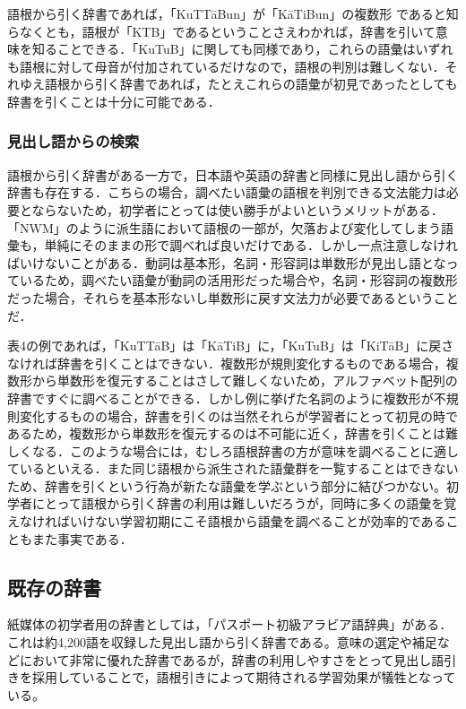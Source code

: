 \documentclass[technicalreport]{ieicej}
\begin{document}
語根から引く辞書であれば，「KuTTāBun」が「KāTiBun」の複数形 であると知らなくとも，語根が「KTB」であるということさえわかれば，辞書を引いて意味を知ることできる．「KuTuB」に関しても同様であり，これらの語彙はいずれも語根に対して母音が付加されているだけなので，語根の判別は難しくない．それゆえ語根から引く辞書であれば，たとえこれらの語彙が初見であったとしても辞書を引くことは十分に可能である．

\subsubsection{見出し語からの検索}
語根から引く辞書がある一方で，日本語や英語の辞書と同様に見出し語から引く辞書も存在する．こちらの場合，調べたい語彙の語根を判別できる文法能力は必要とならないため，初学者にとっては使い勝手がよいというメリットがある．「NWM」のように派生語において語根の一部が，欠落および変化してしまう語彙も，単純にそのままの形で調べれば良いだけである．しかし一点注意しなければいけないことがある．動詞は基本形，名詞・形容詞は単数形が見出し語となっているため，調べたい語彙が動詞の活用形だった場合や，名詞・形容詞の複数形だった場合，それらを基本形ないし単数形に戻す文法力が必要であるということだ．

表4の例であれば，「KuTTāB」は「KāTiB」に，「KuTuB」は「KiTāB」に戻さなければ辞書を引くことはできない．複数形が規則変化するものである場合，複数形から単数形を復元することはさして難しくないため，アルファベット配列の辞書ですぐに調べることができる．しかし例に挙げた名詞のように複数形が不規則変化するものの場合，辞書を引くのは当然それらが学習者にとって初見の時であるため，複数形から単数形を復元するのは不可能に近く，辞書を引くことは難しくなる．このような場合には，むしろ語根辞書の方が意味を調べることに適しているといえる．また同じ語根から派生された語彙群を一覧することはできないため、辞書を引くという行為が新たな語彙を学ぶという部分に結びつかない。初学者にとって語根から引く辞書の利用は難しいだろうが，同時に多くの語彙を覚えなければいけない学習初期にこそ語根から語彙を調べることが効率的であることもまた事実である．

\subsection{既存の辞書}
紙媒体の初学者用の辞書としては，「パスポート初級アラビア語辞典」がある．これは約4,200語を収録した見出し語から引く辞書である。意味の選定や補足などにおいて非常に優れた辞書であるが，辞書の利用しやすさをとって見出し語引きを採用していることで，語根引きによって期待される学習効果が犠牲となっている。
\end{document}
